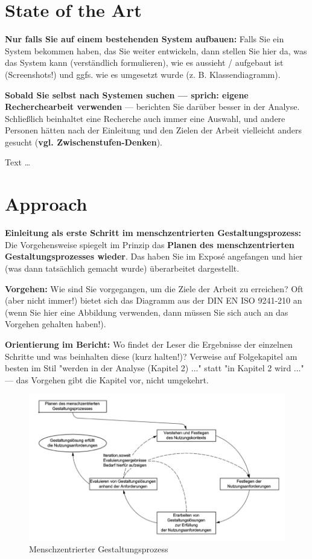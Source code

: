 \documentclass[11pt,a4paper,english]{scrreprt}
\newenvironment{comment}
  {\par\medskip
   \begingroup\color{olive}%
   }
 {\endgroup
  \medskip}
\begin{document}
\section{State of the Art}
\begin{comment}
\textbf{Nur falls Sie auf einem bestehenden System aufbauen:} Falls Sie ein System bekommen haben, das Sie weiter entwickeln, dann stellen Sie hier da, was das System kann (verständlich formulieren), wie es aussieht / aufgebaut ist (Screenshots!) und ggfs. wie es umgesetzt wurde (z. B. Klassendiagramm).

\textbf{Sobald Sie selbst nach Systemen suchen — sprich: eigene Recherchearbeit verwenden} — berichten Sie darüber besser in der Analyse. Schließlich beinhaltet eine Recherche auch immer eine Auswahl, und andere Personen hätten nach der Einleitung und den Zielen der Arbeit vielleicht anders gesucht (\textbf{vgl. Zwischenstufen-Denken}).
\end{comment}

Text \dots

\section{Approach}
\begin{comment}
\textbf{Einleitung als erste Schritt im menschzentrierten Gestaltungsprozess:} Die Vorgehensweise spiegelt im Prinzip das \textbf{Planen des menschzentrierten Gestaltungsprozesses wieder}. Das haben Sie im Exposé angefangen und hier (was dann tatsächlich gemacht wurde) überarbeitet dargestellt.

\textbf{Vorgehen:} Wie sind Sie vorgegangen, um die Ziele der Arbeit zu erreichen? Oft (aber nicht immer!) bietet sich das Diagramm aus der DIN EN ISO 9241-210 an (wenn Sie hier eine Abbildung verwenden, dann müssen Sie sich auch an das Vorgehen gehalten haben!).

\textbf{Orientierung im Bericht:} Wo findet der Leser die Ergebnisse der einzelnen Schritte und was beinhalten diese (kurz halten!)? Verweise auf Folgekapitel am besten im Stil "werden in der Analyse (Kapitel 2) ..." statt "in Kapitel 2 wird ..." — das Vorgehen gibt die Kapitel vor, nicht umgekehrt.
\end{comment}

\begin{figure}[htbp]
    \centering
    \includegraphics[width=\textwidth]{img/Picture1.png}
    \caption{Menschzentrierter Gestaltungsprozess \parencite{DIN}}
    \label{fig:picture1}
\end{figure}
\end{document}
